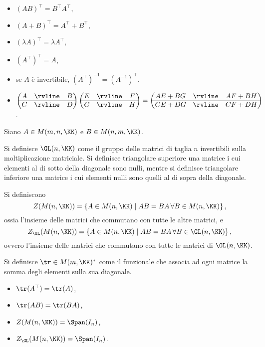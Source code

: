 \documentclass[10pt,landscape]{article}
\begin{document}
\begin{multicols}{3}
		\begin{itemize}
			\item $(AB)^\top = B^\top A^\top$,
			\item $(A+B)^\top = A^\top + B^\top$,
			\item $(\lambda A)^\top = \lambda A^\top$,
			\item $(A^\top)^\top = A$,
			\item se $A$ è invertibile, $(A^\top)^{-1} = (A^{-1})^\top$,
			\item $ \begin{pmatrix}
				A
				& \rvline & B \\
				\hline
				C & \rvline &
				D
			\end{pmatrix}\begin{pmatrix}
				E
				& \rvline & F \\
				\hline
				G & \rvline &
				H
			\end{pmatrix}=\begin{pmatrix}
				AE+BG
				& \rvline & AF+BH  \\
				\hline
				CE+DG & \rvline &
				CF+DH
			\end{pmatrix}$.
		\end{itemize}
		
		Siano $A \in M(m, n, \KK)$ e $B \in M(n, m, \KK)$.
		
		Si definisce $\GL(n, \KK)$ come il gruppo delle matrici
		di taglia $n$ invertibili sulla moltiplicazione matriciale. Si definisce
		triangolare superiore una matrice i cui elementi al di sotto
		della diagonale sono nulli, mentre si definisce triangolare
		inferiore una matrice i cui elementi nulli sono quelli al di sopra
		della diagonale.
		
		Si definiscono
		\[ Z(M(n, \KK)) = \left\{ A \in M(n, \KK) \mid AB=BA \, \forall B \in M(n, \KK) \right\}, \]
		ossia l'insieme delle matrici che commutano con tutte le altre matrici, e
		\[ Z_{\GL}(M(n, \KK)) = \left\{ A \in M(n, \KK) \mid AB=BA \, \forall B \in \GL(n, \KK) \right\}, \]
		ovvero l'insieme delle matrici che commutano con tutte le matrici
		di $\GL(n, \KK)$.
		
		Si definisce $\tr \in M(m, \KK)^*$ come il funzionale che associa
		ad ogni matrice la somma degli elementi sulla sua diagonale. 
		
		\begin{itemize}
			\item $\tr(A^\top) = \tr(A)$,
			\item $\tr(AB) = \tr(BA)$,
			\item $Z(M(n, \KK)) = \Span(I_n)$,
			\item $Z_{\GL}(M(n, \KK)) = \Span(I_n)$.
		\end{itemize}
		

\end{multicols}
\end{document}
